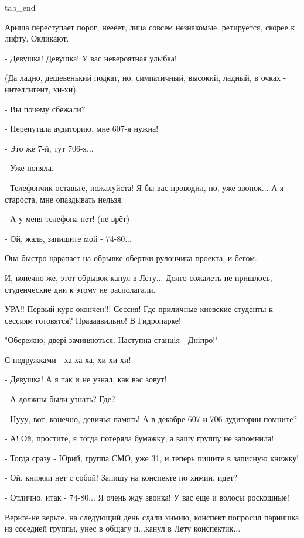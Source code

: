   tab_end
\fi

Ариша переступает порог, неееет, лица  совсем незнакомые, ретируется, скорее к
лифту. Окликают.

- Девушка! Девушка! У вас невероятная улыбка!

(Да ладно, дешевенький подкат, но, симпатичный, высокий, ладный, в очках -
интеллигент, хи-хи).

- Вы почему сбежали?

- Перепутала аудиторию, мне 607-я нужна!

- Это же 7-й, тут 706-я...

- Уже поняла.

- Телефончик оставьте, пожалуйста! Я бы вас проводил, но, уже звонок... А я -
староста, мне опаздывать нельзя.

- А у меня телефона нет! (не врёт)

- Ой, жаль, запишите мой - 74-80...

Она быстро царапает на обрывке обертки рулончика проекта, и бегом.


И, конечно же, этот обрывок канул в Лету... Долго сожалеть не пришлось,
студенческие дни к этому не располагали.

УРА!! Первый курс окончен!!! Сессия! Где приличные киевские студенты к сессиям
готовятся? Праааавильно! В Гидропарке!

"Обережно, двері зачиняються. Наступна станція - Дніпро!"

С подружками - ха-ха-ха, хи-хи-хи!

- Девушка! А я так и не узнал, как вас зовут!

- А должны были узнать? Где?

- Нууу, вот, конечно, девичья память! А в декабре 607 и 706 аудитории помните?

- А! Ой, простите, я тогда потеряла бумажку, а вашу группу не запомнила!

- Тогда сразу - Юрий, группа СМО, уже 31, и теперь пишите в записную книжку!

- Ой,  книжки  нет с собой! Запишу на конспекте по химии, идет?

- Отлично, итак - 74-80... Я очень жду звонка! У вас еще и волосы роскошные!


Верьте-не верьте, на следующий день сдали химию, конспект попросил парнишка из
соседней группы, унес в общагу и...канул в Лету  конспектик...

